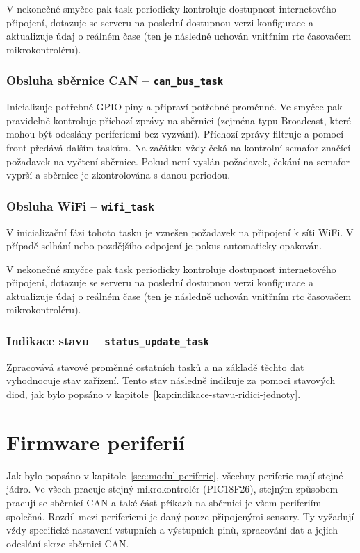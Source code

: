             V nekonečné smyčce pak task periodicky kontroluje dostupnost internetového připojení, dotazuje se serveru na poslední dostupnou verzi konfigurace a aktualizuje údaj o reálném čase (ten je následně uchován vnitřním \acs{rtc} časovačem mikrokontroléru).

        \subsubsection{Obsluha sběrnice CAN --  \texttt{can\_bus\_task}}
            Inicializuje potřebné GPIO piny a připraví potřebné proměnné. Ve smyčce pak pravidelně kontroluje příchozí zprávy na sběrnici (zejména typu Broadcast, které mohou být odeslány periferiemi bez vyzvání). Příchozí zprávy filtruje a pomocí front předává dalším taskům. Na začátku vždy čeká na kontrolní semafor značící požadavek na vyčtení sběrnice. Pokud není vyslán požadavek, čekání na semafor vyprší a sběrnice je zkontrolována s danou periodou.

            \subsubsection{Obsluha WiFi --  \texttt{wifi\_task}}
            V inicializační fázi tohoto tasku je vznešen požadavek na připojení k síti WiFi. V případě selhání nebo pozdějšího odpojení je pokus automaticky opakován. 
            
            V nekonečné smyčce pak task periodicky kontroluje dostupnost internetového připojení, dotazuje se serveru na poslední dostupnou verzi konfigurace a aktualizuje údaj o reálném čase (ten je následně uchován vnitřním \acs{rtc} časovačem mikrokontroléru).

        \subsubsection{Indikace stavu --  \texttt{status\_update\_task}}
            Zpracovává stavové proměnné ostatních tasků a na základě těchto dat vyhodnocuje stav zařízení. Tento stav následně indikuje za pomoci stavových diod, jak bylo popsáno v kapitole~\ref{kap:indikace-stavu-ridici-jednoty}.



\section{Firmware periferií}
    Jak bylo popsáno v kapitole~\ref{sec:modul-periferie}, všechny periferie mají stejné jádro. Ve všech pracuje stejný mikrokontrolér (PIC18F26), stejným způsobem pracují se sběrnicí CAN a také část příkazů na sběrnici je všem periferiím společná. Rozdíl mezi periferiemi je daný pouze připojenými sensory. Ty vyžadují vždy specifické nastavení vstupních a výstupních pinů, zpracování dat a jejich odeslání skrze sběrnici CAN. 

